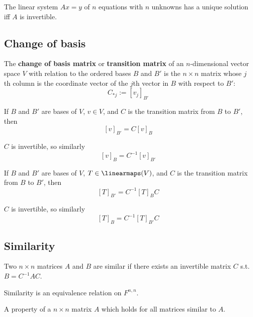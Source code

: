 \begin{lemma}
  The linear system $Ax = y$ of $n$ equations with $n$ unknowns has a unique solution iff $A$ is invertible.
\end{lemma}

\subsection{Change of basis}

\begin{definition}
  The \textbf{change of basis matrix} or \textbf{transition matrix} of an $n$-dimensional vector space $V$ with relation to the ordered bases $B$ and $B'$ is the $n \times n$ matrix whose $j$th column is the coordinate vector of the $j$th vector in $B$ with respect to $B'$:
  \[
    C_{*j} := [v_j]_{B'}
  \]
\end{definition}

\begin{lemma}
  If $B$ and $B'$ are bases of $V$, $v \in V$, and $C$ is the transition matrix from $B$ to $B'$, then
  \[
    [v]_{B'} = C [v]_{B}
  \]

  $C$ is invertible, so similarly
  \[
    [v]_{B} = C^{-1} [v]_{B'}
  \]
\end{lemma}

\begin{lemma}
  If $B$ and $B'$ are bases of $V$, $T \in \linearmaps(V)$, and $C$ is the transition matrix from $B$ to $B'$, then
  \[
    [T]_{B'} = C^{-1} [T]_B C
  \]

  $C$ is invertible, so similarly
  \[
    [T]_{B} = C^{-1} [T]_{B'} C
  \]
\end{lemma}

\subsection{Similarity}

\begin{definition}
  Two $n \times n$ matrices $A$ and $B$ are similar if there exists an invertible matrix $C$ s.t. $B = C^{-1} A C$.

  Similarity is an equivalence relation on $F^{n,n}$.
\end{definition}

\begin{definition}
  A property of a $n \times n$ matrix $A$ which holds for all matrices similar to $A$.
\end{definition}


